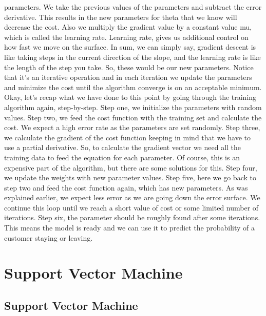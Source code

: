 parameters. We take the previous values of the parameters and subtract the error derivative. This results in the new parameters for theta that we know will decrease the cost. Also we multiply the gradient value by a constant value mu, which is called the learning rate. Learning rate, gives us additional control on how fast we move on the surface. In sum, we can simply say, gradient descent is like taking steps in the current direction of the slope, and the learning rate is like the length of the step you take. So, these would be our new parameters. Notice that it's an iterative operation and in each iteration we update the parameters and minimize the cost until the algorithm converge is on an acceptable minimum. Okay, let's recap what we have done to this point by going through the training algorithm again, step-by-step. Step one, we initialize the parameters with random values. Step two, we feed the cost function with the training set and calculate the cost. We expect a high error rate as the parameters are set randomly. Step three, we calculate the gradient of the cost function keeping in mind that we have to use a partial derivative. So, to calculate the gradient vector we need all the training data to feed the equation for each parameter. Of course, this is an expensive part of the algorithm, but there are some solutions for this. Step four, we update the weights with new parameter values. Step five, here we go back to step two and feed the cost function again, which has new parameters. As was explained earlier, we expect less error as we are going down the error surface. We continue this loop until we reach a short value of cost or some limited number of iterations. Step six, the parameter should be roughly found after some iterations. This means the model is ready and we can use it to predict the probability of a customer staying or leaving. 	

\section{Support Vector Machine}

	\subsection{Support Vector Machine}
	

